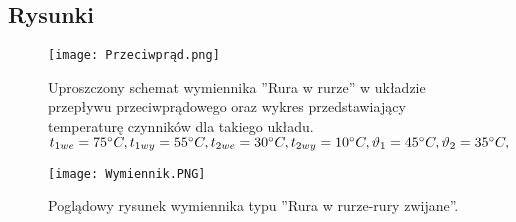 \pagebreak
\subsection{Rysunki}
    \vspace{20px}
    \begin{figure}[ht]
        \centering
        \texttt{[image: Przeciwprąd.png]}
            \caption{Uproszczony schemat wymiennika ''Rura w rurze'' w układzie przepływu przeciwprądowego oraz wykres przedstawiający temperaturę czynników dla takiego układu.\\
            \(t_{1we}=75^\circ C,t_{1wy}=55^\circ C,t_{2we}=30^\circ C,t_{2wy}=10^\circ C,\vartheta _1=45^\circ C,\vartheta _2=35^\circ C,\)}
        \centering
        \texttt{[image: Wymiennik.PNG]}
            \caption{Poglądowy rysunek wymiennika typu ''Rura w rurze-rury zwijane''.}
    \end{figure}

